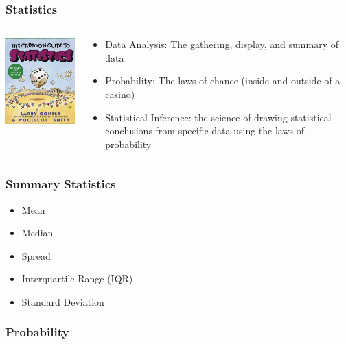 \documentclass{beamer}
\begin{document}
\begin{frame}\frametitle{Statistics}
\begin{columns}
\begin{column}{5cm}
\begin{center}
\includegraphics[width=5cm]{fig/cartoonguidestats.jpg}
\end{center}
\end{column}
\begin{column}{5cm}
\begin{itemize}
\item Data Analysis: The gathering, display, and summary of data
\item Probability: The laws of chance (inside and outside of a casino)
\item Statistical Inference: the science of drawing statistical conclusions from specific data using the laws of probability
\end{itemize}
\end{column}
\end{columns}
\end{frame}

\begin{frame}\frametitle{Summary Statistics}
\begin{itemize}
\item Mean
\item Median
\item Spread
\item Interquartile Range (IQR)
\item Standard Deviation
\end{itemize}
\end{frame}


\begin{frame}\frametitle{Probability}

\end{frame}
\end{document}
